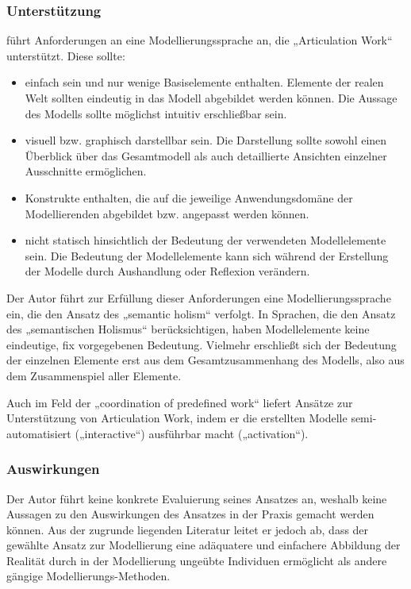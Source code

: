 \subsubsection{Unterstützung}

\citeauthor{Jorgensen04} führt Anforderungen an eine Modellierungssprache an, die „Articulation Work“ unterstützt. \label{steps:jorgensen} Diese sollte:
\begin{itemize}
	\item einfach sein und nur wenige Basiselemente enthalten. Elemente der realen Welt sollten eindeutig in das Modell abgebildet werden können. Die Aussage des Modells sollte möglichst intuitiv erschließbar sein.
	\item visuell bzw. graphisch darstellbar sein. Die Darstellung sollte sowohl einen Überblick über das Gesamtmodell als auch detaillierte Ansichten einzelner Ausschnitte ermöglichen.
	\item Konstrukte enthalten, die auf die jeweilige Anwendungsdomäne der Modellierenden abgebildet bzw. angepasst werden können.
	\item nicht statisch hinsichtlich der Bedeutung der verwendeten Modellelemente sein. Die Bedeutung der Modellelemente kann sich während der Erstellung der Modelle durch Aushandlung oder Reflexion verändern.
\end{itemize}

Der Autor führt zur Erfüllung dieser Anforderungen eine Modellierungssprache ein, die den Ansatz des „semantic holism“ verfolgt. In Sprachen, die den Ansatz des „semantischen Holismus“ berücksichtigen, haben Modellelemente keine eindeutige, fix vorgegebenen Bedeutung. Vielmehr erschließt sich der Bedeutung der einzelnen Elemente erst aus dem Gesamtzusammenhang des Modells, also aus dem Zusammenspiel aller Elemente.

Auch im Feld der „coordination of predefined work“ liefert \citet{Jorgensen04} Ansätze zur Unterstützung von Articulation Work, indem er die erstellten Modelle semi-automatisiert („interactive“) ausführbar macht („activation“).

\subsubsection{Auswirkungen}

Der Autor führt keine konkrete Evaluierung seines Ansatzes an, weshalb keine Aussagen zu den Auswirkungen des Ansatzes in der Praxis gemacht werden können. Aus der zugrunde liegenden Literatur leitet er jedoch ab, dass der gewählte Ansatz zur Modellierung eine adäquatere und einfachere Abbildung der Realität durch in der Modellierung ungeübte Individuen ermöglicht als andere gängige Modellierungs-Methoden.

